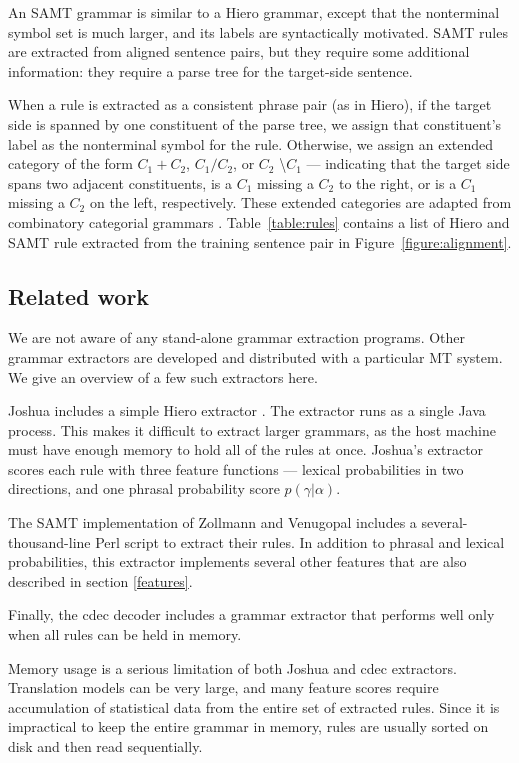 \documentclass[11pt]{article}
\begin{document}
An SAMT grammar \cite{samt2006} is similar to a Hiero grammar, except
that the nonterminal symbol set is much larger, and its labels are
syntactically motivated.  SAMT rules are extracted from aligned sentence pairs, but they require some additional information: they require a parse tree for the target-side sentence.

When a rule is extracted as a consistent phrase pair (as in Hiero), if
the target side is spanned by one constituent of the parse tree, we
assign that constituent's label as the nonterminal symbol for the
rule.  Otherwise, we assign an extended category of the form
$C_1+C_2$, $C_1 / C_2$, or $C_2$ \textbackslash $C_1$ --- indicating
that the target side spans two adjacent constituents, is a $C_1$
missing a $C_2$ to the right, or is a $C_1$ missing a $C_2$ on the
left, respectively.  These extended categories are adapted from
combinatory categorial grammars \cite{Steedman1999}.
Table~\ref{table:rules} contains a list of Hiero and SAMT rule
extracted from the training sentence pair in Figure~\ref{figure:alignment}.

\subsection{Related work}

We are not aware of any stand-alone grammar extraction programs. Other grammar extractors are developed and distributed with a particular MT system. We give an overview of a few such extractors here.

Joshua includes a simple Hiero extractor \cite{schwartz2010}. The extractor runs as a single Java process. This makes it difficult to extract larger grammars, as the host machine must have enough memory to hold all of the rules at once. Joshua's extractor scores each rule with three feature functions --- lexical probabilities in two directions, and one phrasal probability score $p(\gamma|\alpha)$.

The SAMT implementation of Zollmann and Venugopal  includes a several-thousand-line Perl script to extract their rules. In addition to phrasal and lexical probabilities, this extractor implements several other features that are also described in section \ref{features}.

Finally, the cdec decoder \cite {cdec} includes a grammar extractor that performs well only when all rules can be held in memory.

Memory usage is a serious limitation of both Joshua and cdec extractors. Translation models can be very large, and many feature scores require accumulation of statistical data from the entire set of extracted rules. Since it is impractical to keep the entire grammar in memory, rules are usually sorted on disk and then read sequentially.
\end{document}
